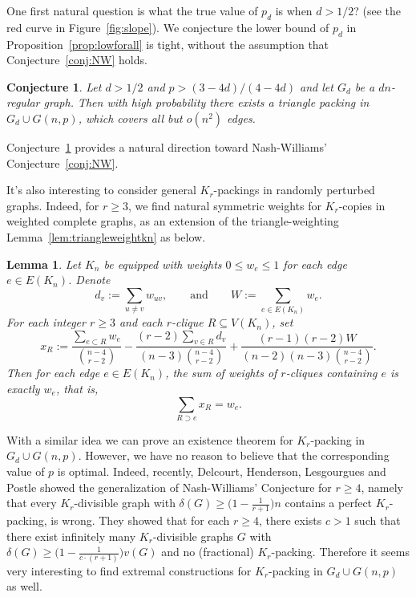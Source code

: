 \documentclass[11pt,reqno]{amsart}
\newtheorem{lemma}[theorem]{Lemma}
\newtheorem{conjecture}[theorem]{Conjecture}
\theoremstyle{definition}
\theoremstyle{remark}
\renewcommand\leq{\leqslant}
\renewcommand\geq{\geqslant}
\begin{document}
One first natural question is what the true value of $p_d$ is when $d>1/2$? (see the red curve in Figure~\ref{fig:slope}).
We conjecture the lower bound of $p_d$ in Proposition~\ref{prop:lowforall} is tight, without the assumption that Conjecture~\ref{conj:NW} holds.


\begin{conjecture}\label{conj:d>1/2}
Let $d>1/2$ and $p>(3-4d)/(4-4d)$ and let $G_d$ be a $dn$-regular graph. Then with high probability there exists a triangle packing in $G_d\cup G(n,p)$, which covers all but $o(n^2)$ edges.
\end{conjecture}

Conjecture~\ref{conj:d>1/2} provides a natural direction toward  Nash-Williams' Conjecture~\ref{conj:NW}.

It's also interesting to consider general $K_r$-packings in randomly perturbed graphs. Indeed, for $r\geq 3$, we find  natural symmetric weights for $K_r$-copies in weighted complete graphs, as an extension of the triangle-weighting Lemma~\ref{lem:triangleweightkn} as below. 


\begin{lemma}
Let $K_n$ be equipped with weights $0 \leq w_e \leq 1$ for each edge $e \in E(K_n)$. Denote
\[ d_v := \sum_{u \neq v} w_{uv}, \qquad \text{and} \qquad W := \sum_{e \in E(K_n)} w_e. \]
For each integer $r \geq 3$ and each $r$-clique $R \subseteq V(K_n)$, set
\[ x_R := \frac{\sum_{e \subset R} w_e}{\binom{n-4}{r-2}} - \frac{(r-2) \sum_{v \in R} d_v}{(n-3)\binom{n-4}{r-2}} + \frac{(r-1)(r-2) W}{(n-2)(n-3)\binom{n-4}{r-2}}. \]
Then for each edge $e \in E(K_n)$, the sum of weights of $r$-cliques containing $e$ is exactly $w_e$, that is,
\[ \sum_{R \supset e} x_R = w_e. \]
\end{lemma}

With a similar idea we can prove an existence theorem for $K_r$-packing in $G_d\cup G(n,p)$. However, we have no reason to believe that the corresponding value of $p$ is optimal. Indeed, recently, Delcourt, Henderson, Lesgourgues and Postle \cite{DHLP}  showed the generalization of Nash-Williams’ Conjecture for $r\geq 4$, namely that every $K_r$-divisible graph with $\delta(G)\geq \big(1-\frac{1}{r+1}\big)n$ contains a perfect $K_r$-packing, is wrong. They showed that for each $r\geq 4$, there exists $c>1$ such that there exist infinitely many $K_r$-divisible graphs $G$ with $\delta(G)\geq \big(1-\frac{1}{c\cdot(r+1)}\big)v(G)$ and no (fractional) $K_r$-packing. Therefore it seems very interesting to find extremal constructions for $K_r$-packing in $G_d\cup G(n,p)$ as well.
\end{document}
